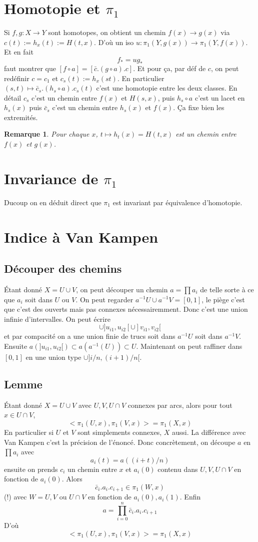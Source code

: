 \documentclass[a4paper,12pt]{book}
\theoremstyle{plain}
\newtheorem{rem}{Remarque}
\theoremstyle{definition}
\theoremstyle{remark}
\begin{document}
\section{Homotopie et $\pi_1$}
Si $f,g\colon X\to Y$ sont homotopes, on obtient un chemin
$f(x)\to g(x)$ via $c(t):=h_x(t):=H(t,x)$. D'où un iso
$u\colon \pi_1(Y,g(x))\to \pi_1(Y,f(x))$. Et en fait
\[f_*=ug_*\]
faut montrer que $[f\circ a]=[\bar c.(g\circ a).c]$. Et pour ça,
par déf de $c$, on peut redéfinir $c=c_1$ et $c_s(t):=h_x(st)$.
En particulier $(s,t)\mapsto \bar c_s.(h_s\circ a).c_s(t)$
c'est une homotopie entre les deux classes. En détail
$c_s$ c'est un chemin entre $f(x)$ et $H(s,x)$, puis $h_s\circ a$
c'est un lacet en $h_s(x)$ puis $\bar c_s$ c'est un chemin entre
$h_s(x)$ et $f(x)$. Ça fixe bien les extremités. 
\begin{rem}
  Pour chaque $x$, $t\mapsto h_t(x)=H(t,x)$
  est un chemin entre $f(x)$ et $g(x)$.
\end{rem}
\section{Invariance de $\pi_1$}
Ducoup on en déduit direct que $\pi_1$ est invariant par 
équivalence d'homotopie.
\section{Indice à Van Kampen}
\subsection{Découper des chemins}
Étant donné $X=U\cup V$, on peut découper un chemin $a=\prod a_i$
de telle sorte à ce que $a_i$ soit dans $U$ ou $V$. On peut
regarder $a^{-1}U\cup a^{-1}V=[0,1]$, le piège c'est que c'est
des ouverts mais pas connexes nécessairemment. Donc c'est une 
union infinie d'intervalles. On peut écrire 
\[\cup ]u_{i1},u_{i2}[\cup ]v_{i1},v_{i2}[\]
et par compacité on a une union finie de trucs soit dans $a^{-1}U$
soit dans $a^{-1}V$. Ensuite 
$a(]u_{i1},u_{i2}[)\subset a(a^{-1}(U))\subset U$. Maintenant on
peut raffiner dans $[0,1]$ en une union type $\cup ]i/n,(i+1)/n[$.

\subsection{Lemme}
Étant donné $X=U\cup V$ avec $U,V,U\cap V$ connexes par arcs, alors
pour tout $x\in U\cap V$, 
\[<\pi_1(U,x),\pi_1(V,x)>=\pi_1(X,x)\]
En particulier si $U$ et $V$ sont simplements connexes, $X$ aussi.
La différence avec Van Kampen c'est la précision de l'énoncé. 
Donc concrètement, on découpe $a$ en $\prod a_i$ avec 
\[a_i(t)=a((i+t)/n)\]
ensuite on prends $c_i$ un chemin entre $x$ et $a_i(0)$ contenu
dans $U,V,U\cap V$ en fonction de $a_i(0)$. Alors
\[\bar c_i.a_i.c_{i+1}\in \pi_1(W,x)\]
(!) avec $W=U,V$ ou $U\cap V$ en fonction de $a_i(0),a_i(1)$.
Enfin
\[a=\prod_{i=0}^n \bar c_i.a_i.c_{i+1}\]
D'où \[<\pi_1(U,x),\pi_1(V,x)>=\pi_1(X,x)\]
\end{document}
